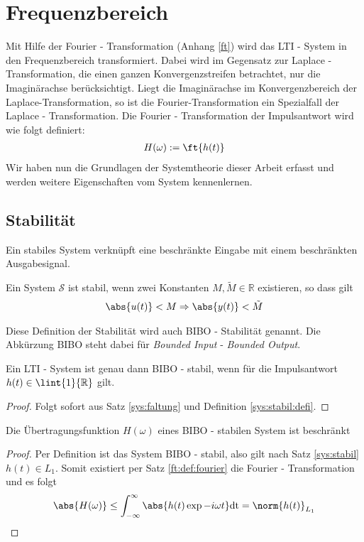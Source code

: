 \section{Frequenzbereich}
Mit Hilfe der Fourier - Transformation (Anhang \ref{ft}) wird das LTI - System in den Frequenzbereich transformiert. Dabei wird im Gegensatz zur Laplace - Transformation, die einen ganzen Konvergenzstreifen betrachtet, nur die Imaginärachse berücksichtigt. Liegt die Imaginärachse im Konvergenzbereich der Laplace-Transformation, so ist die Fourier-Transformation ein Spezialfall der Laplace - Transformation.
Die Fourier - Transformation der Impulsantwort wird wie folgt definiert:
\begin{align}
H(\omega) := \ft{h(t)} 
\end{align}
Wir haben nun die Grundlagen der Systemtheorie dieser Arbeit erfasst und werden weitere Eigenschaften vom System kennenlernen. 

\subsection{Stabilität}
Ein stabiles System verknüpft eine beschränkte Eingabe mit einem beschränkten Ausgabesignal.
\begin{defi}\label{sys:stabil:defi}
Ein System $\mathscr{S}$ ist stabil, wenn zwei Konstanten $M, \tilde{M} \in \mathbb{R}$ existieren, so dass gilt
\begin{align}
	\abs{u(t)} < M \Rightarrow \abs{y(t)} < \tilde{M}
\end{align}
\end{defi}
\begin{bem}
Diese Definition der Stabilität wird auch BIBO - Stabilität genannt. Die Abkürzung BIBO steht dabei für \textit{Bounded Input} - \textit{Bounded Output}. 
\end{bem}
\begin{satz}\label{sys:stabil} Ein LTI - System ist genau dann BIBO - stabil, wenn für die Impulsantwort $h(t) \in \lint{1}{\mathbb{R}}$ gilt.
\begin{proof}
Folgt sofort aus Satz \ref{sys:faltung} und Definition \ref{sys:stabil:defi}.
\end{proof}
\end{satz}
\begin{satz}
Die Übertragungsfunktion $H(\omega)$ eines BIBO - stabilen System ist beschränkt
\begin{proof}
	Per Definition ist das System BIBO - stabil, also gilt nach Satz \ref{sys:stabil} $h(t) \in L_1$. Somit existiert per Satz \ref{ft:def:fourier} die Fourier - Transformation und es folgt
	\begin{align}
		\abs{H(\omega)} \leq \int_{-\infty}^{\infty} \abs{h(t) \exp{-i \omega t}} \mathrm{dt} = \norm{h(t)}_{L_1}
	\end{align}
\end{proof}
\end{satz}

